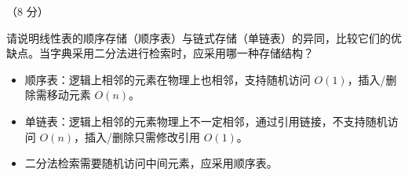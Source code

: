 \begin{question}[线性表存储结构比较]（8 分）

请说明线性表的顺序存储（顺序表）与链式存储（单链表）的异同，比较它们的优缺点。当字典采用二分法进行检索时，应采用哪一种存储结构？

\begin{solution}
\begin{itemize}
  \item 顺序表：逻辑上相邻的元素在物理上也相邻，支持随机访问 $O(1)$，插入/删除需移动元素 $O(n)$。
  \item 单链表：逻辑上相邻的元素物理上不一定相邻，通过引用链接，不支持随机访问 $O(n)$，插入/删除只需修改引用 $O(1)$。
  \item 二分法检索需要随机访问中间元素，应采用顺序表。
\end{itemize}
\end{solution}
\end{question}

